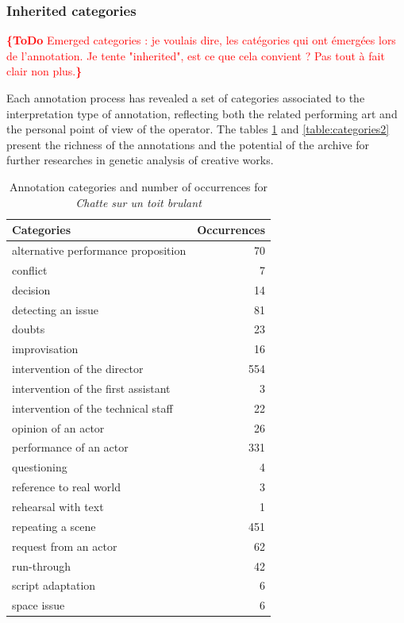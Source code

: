 \documentclass[conference]{IEEEtran}
\newcommand{\todo}[1]{\noindent\textcolor{red}{{\bf \{ToDo} #1{\bf \}}}}
\begin{document}
\subsubsection{Inherited categories}
\todo{Emerged categories : je voulais dire, les catégories qui ont émergées lors de l'annotation. Je tente "inherited", est ce que cela convient ? Pas tout à fait clair non plus.}

Each annotation process has revealed a set of categories associated to the interpretation type of annotation, reflecting both the related performing art and the personal point of view of the operator. The tables \ref{table:categories1} and \ref{table:categories2} present the richness of the annotations and the potential of the archive for further researches in genetic analysis of creative works.

\begin{table}
\centering
\begin{tabular}{|p{4cm}|r|}
\hline 
Categories & Occurrences \\ 
\hline 
alternative performance proposition & 70 \\ 
\hline 
conflict & 7 \\ 
decision & 14 \\ 
\hline 
detecting an issue & 81 \\ 
\hline 
doubts & 23 \\ 
\hline 
improvisation & 16 \\ 
\hline 
intervention of the director & 554 \\ 
\hline 
intervention of the first assistant & 3 \\ 
\hline 
intervention of the technical staff & 22 \\ 
\hline 
opinion of an actor & 26 \\ 
\hline 
performance of an actor & 331 \\ 
\hline 
questioning & 4 \\ 
\hline 
reference to real world & 3 \\ 
\hline 
rehearsal with text & 1 \\ 
\hline 
repeating a scene & 451 \\ 
\hline 
request from an actor & 62 \\ 
\hline 
run-through & 42 \\ 
\hline 
script adaptation & 6 \\ 
\hline 
space issue & 6 \\ 
\hline 
\end{tabular}
\label{table:categories1}
\caption{Annotation categories and number of occurrences for \emph{Chatte sur un toit brulant}}
\end{table} 
\end{document}

